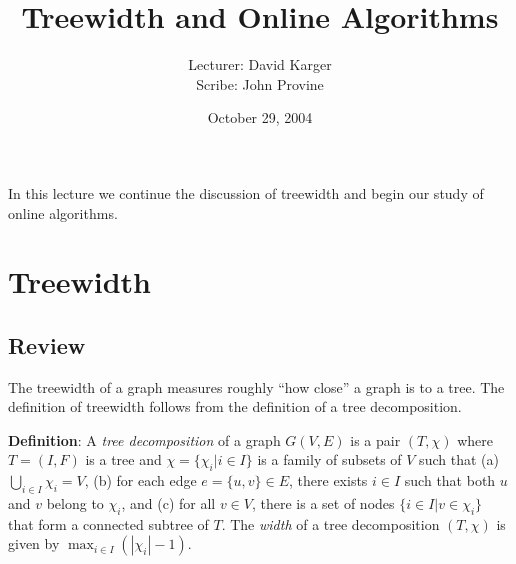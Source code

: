 \documentclass{article}
\title{Treewidth and Online Algorithms}
\date{October 29, 2004}
\author{Lecturer: David Karger\\ Scribe: John Provine}
\begin{document}
%
%
%
%

%




In this lecture we continue the discussion of treewidth and begin
our study of online algorithms.

\section{Treewidth}

\subsection{Review}

The treewidth of a graph measures roughly ``how close'' a graph is
to a tree. The definition of treewidth follows from the definition
of a tree decomposition.

\textbf{Definition}:
A \emph{tree decomposition} of a graph $G(V,E)$ is a pair
$(T,\chi)$ where $T=(I,F)$ is a tree and $\chi=\{\chi_i|i\in I\}$
is a family of subsets of $V$ such that (a) $\bigcup_{i\in
I}\chi_i=V$, (b) for each edge $e=\{u,v\}\in E$, there exists
$i\in I$ such that both $u$ and $v$ belong to $\chi_i$, and (c)
for all $v\in V$, there is a set of nodes $\{i\in I|v\in\chi_i\}$
that form a connected subtree of $T$. The \emph{width} of a tree
decomposition $(T,\chi)$ is given by $\max_{i\in I}(|\chi_i|-1)$.
\end{document}
